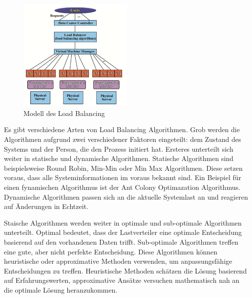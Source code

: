 \documentclass[a4paper,12pt]{article}
\begin{document}
\begin{figure}[h]
    \centering
    \includegraphics[width=0.5\textwidth]{images/Load_Balancing.png}
    \caption{Modell des Load Balancing}
    \label{fig:LoadBalancing}
\end{figure}

Es gibt verschiedene Arten von Load Balancing Algorithmen. Grob werden die Algorithmen aufgrund zwei verschiedener Faktoren eingeteilt: dem Zustand des Systems und der Person, die den Prozess initiert hat. 
Ersteres unterteilt sich weiter in statische und dynamische Algorithmen. Statische Algorithmen sind beispielsweise Round Robin, Min-Min oder Min Max Algorithmen. Diese setzen voraus, dass alle Systeminformationen im voraus bekannt sind. Ein Beispiel für einen fynamischen Algorithmus ist der Ant Colony Optimazation Algorithmus. Dynamische Algorithmen passen sich an die aktuelle Systemlast an und reagieren auf Änderungen in Echtzeit. 

Staische Algorithmen werden weiter in optimale und sub-optimale Algorithmen unterteilt. Optimal bedeutet, dass der Lastverteiler eine optimale Entscheidung basierend auf den vorhandenen Daten trifft. Sub-optimale Algorithmen treffen eine gute, aber nicht perfekte Entscheidung. Diese Algorithmen können heuristische oder approximative Methoden verwenden, um anpassungsfähige Entscheidungen zu treffen. Heuristische Methoden schätzen die Lösung basierend auf Erfahrungswerten, approximative Ansätze versuchen mathematisch nah an die optimale Lösung heranzukommen. 
\end{document}
